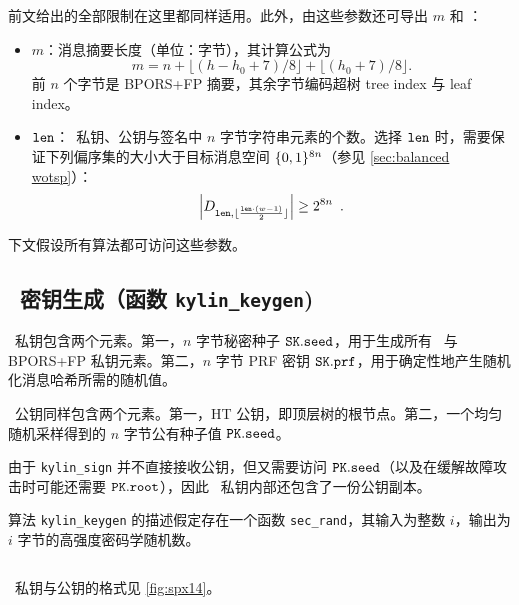 前文给出的全部限制在这里都同样适用。此外，由这些参数还可导出 $m$ 和 \wotslen：

\begin{itemize}
    \item $m$：消息摘要长度（单位：字节），其计算公式为
    $$
    m=n+\lfloor(h-h_0+7)/8\rfloor+\lfloor(h_0+7)/8\rfloor.
    $$
    前 $n$ 个字节是 BPORS+FP 摘要，其余字节编码超树 tree index 与 leaf index。

    \item $\mathtt{len}$：\WOTSCS\ 私钥、公钥与签名中 $n$ 字节字符串元素的个数。选择 $\mathtt{len}$ 时，需要保证下列偏序集的大小大于目标消息空间 $\{0,1\}^{8n}$（参见 \cref{sec:balanced wotsp}）：
    \[\left| D_{ \mathtt{len}, \lfloor \frac{\mathtt{len} \cdot (w-1)}{2} \rfloor } \right| \geq 2^{8n} \enspace. \]

\end{itemize}
下文假设所有算法都可访问这些参数。

\subsection{\SPHINCSA\ 密钥生成（函数 \texttt{kylin\_keygen})}

\SPHINCSA\ 私钥包含两个元素。第一，$n$ 字节秘密种子 $\sk.\seed$，用于生成所有 \WOTSCS\ 与 BPORS+FP 私钥元素。第二，$n$ 字节 PRF 密钥 $\sk.\prf$，用于确定性地产生随机化消息哈希所需的随机值。

\SPHINCSA\ 公钥同样包含两个元素。第一，HT 公钥，即顶层树的根节点。第二，一个均匀随机采样得到的 $n$ 字节公有种子值 $\pk.\seed$。

由于 \texttt{kylin\_sign} 并不直接接收公钥，但又需要访问 $\pk.\seed$（以及在缓解故障攻击时可能还需要 $\pk.\root$），因此 \SPHINCSA\ 私钥内部还包含了一份公钥副本。

算法 \texttt{kylin\_keygen} 的描述假定存在一个函数 \texttt{sec\_rand}，其输入为整数 $i$，输出为 $i$ 字节的高强度密码学随机数。

\begin{algorithm}
    \inputminted[breaklines,linenos,tabsize=2,mathescape,escapeinside=||]{C}{paper/code/kylin_keygen.cs}
    \caption{\texttt{kylin\_keygen} --- 生成 \SPHINCSA\ 密钥对。}
    \label{alg:spxkeygen}
\end{algorithm}

\SPHINCSA\ 私钥与公钥的格式见 \cref{fig:spx14}。


